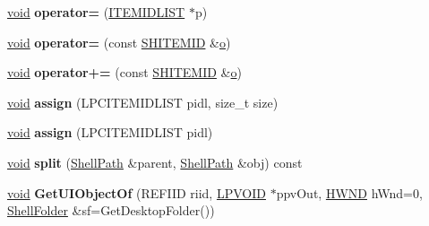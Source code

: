 \begin{DoxyCompactItemize}
\item 
\mbox{\label{struct_shell_path_aa66a53a483aac9eddb47c9f3a43c2be5}} 
\hyperlink{interfacevoid}{void} {\bfseries operator=} (\hyperlink{struct___i_t_e_m_i_d_l_i_s_t}{I\+T\+E\+M\+I\+D\+L\+I\+ST} $\ast$p)
\item 
\mbox{\label{struct_shell_path_a52ce45d89ad91c09a666bc2dd361942a}} 
\hyperlink{interfacevoid}{void} {\bfseries operator=} (const \hyperlink{struct_s_h_i_t_e_m_i_d}{S\+H\+I\+T\+E\+M\+ID} \&\hyperlink{opengl_2mesa_2main_2extensions_8c_ac02068cf344ef10efe2778c164d1233e}{o})
\item 
\mbox{\label{struct_shell_path_ad11b2459113498c62d25411395d5a646}} 
\hyperlink{interfacevoid}{void} {\bfseries operator+=} (const \hyperlink{struct_s_h_i_t_e_m_i_d}{S\+H\+I\+T\+E\+M\+ID} \&\hyperlink{opengl_2mesa_2main_2extensions_8c_ac02068cf344ef10efe2778c164d1233e}{o})
\item 
\mbox{\label{struct_shell_path_a0d75647c9fbafd3c50f9cab7f61d2134}} 
\hyperlink{interfacevoid}{void} {\bfseries assign} (L\+P\+C\+I\+T\+E\+M\+I\+D\+L\+I\+ST pidl, size\+\_\+t size)
\item 
\mbox{\label{struct_shell_path_a8c698e58298c357b138b2c9be9b97a3e}} 
\hyperlink{interfacevoid}{void} {\bfseries assign} (L\+P\+C\+I\+T\+E\+M\+I\+D\+L\+I\+ST pidl)
\item 
\mbox{\label{struct_shell_path_a5983a9f35d402f7cb34f091f93e89d4d}} 
\hyperlink{interfacevoid}{void} {\bfseries split} (\hyperlink{struct_shell_path}{Shell\+Path} \&parent, \hyperlink{struct_shell_path}{Shell\+Path} \&obj) const
\item 
\mbox{\label{struct_shell_path_a33d145383a9ec64550e4b16452222704}} 
\hyperlink{interfacevoid}{void} {\bfseries Get\+U\+I\+Object\+Of} (R\+E\+F\+I\+ID riid, \hyperlink{interfacevoid}{L\+P\+V\+O\+ID} $\ast$ppv\+Out, \hyperlink{interfacevoid}{H\+W\+ND} h\+Wnd=0, \hyperlink{struct_shell_folder}{Shell\+Folder} \&sf=Get\+Desktop\+Folder())
\item 
\mbox{\label{struct_shell_path_a21a26c9f085cea3595c571a57f3ec2a7}} 

\end{DoxyCompactItemize}
